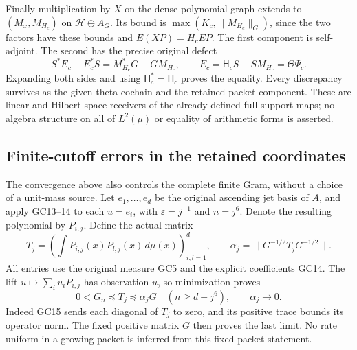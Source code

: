 \documentclass[11pt,a4paper]{article}
\theoremstyle{definition}\newtheorem{definition}[theorem]{Definition}
\begin{document}
Finally multiplication by $X$ on the dense polynomial graph
extends to $(M_x,M_{H_c})$ on $\mathcal H\oplus A_G$.
Its bound is $\max(K_c,\|M_{H_c}\|_G)$, since the two factors
have these bounds and $E(XP)=H_c EP$. The first component is
self-adjoint. The second has the precise original defect
\[
 S^*E_c-E_c^*S=M_{H_c}^*G-GM_{H_c},\qquad
 E_c=\mathsf H_cS-SM_{H_c}=\Theta\Psi_c.
 \tag{GC12}\label{gc:skew-defect}
\]
Expanding both sides and using $\mathsf H_c^*=\mathsf H_c$
proves the equality. Every discrepancy survives as the given
theta cochain and the retained packet component.
These are linear and Hilbert-space receivers of the already
defined full-support maps; no algebra structure on all of
$L^2(\mu)$ or equality of arithmetic forms is asserted.

\subsection{Finite-cutoff errors in the retained coordinates}
The convergence above also controls the complete finite Gram,
without a choice of a unit-mass source. Let $e_1,\ldots,e_d$ be
the original ascending jet basis of $A$, and apply GC13--14 to
each $u=e_i$, with $\varepsilon=j^{-1}$ and $n=j^6$. Denote the
resulting polynomial by $P_{i,j}$. Define the actual matrix
\[
 T_j=\left(\int\overline{P_{i,j}(x)}P_{l,j}(x)\,d\mu(x)
                    \right)_{i,l=1}^d,\qquad
 \alpha_j=\|G^{-1/2}T_jG^{-1/2}\|.
 \tag{GC16}\label{gc:finite-error}
\]
All entries use the original measure GC5 and the explicit
coefficients GC14. The lift $u\mapsto\sum_i u_iP_{i,j}$ has
observation $u$, so minimization proves
\[
 0<G_n\preceq T_j\preceq\alpha_jG
 \quad(n\ge d+j^6),\qquad \alpha_j\longrightarrow0.
 \tag{GC17}\label{gc:finite-domination}
\]
Indeed GC15 sends each diagonal of $T_j$ to zero, and its positive
trace bounds its operator norm. The fixed positive matrix $G$
then proves the last limit. No rate uniform in a growing packet
is inferred from this fixed-packet statement.
\end{document}
